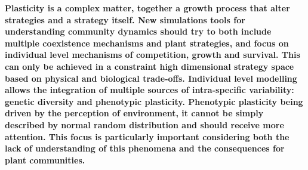 %



\textbf{Plasticity is a complex matter, together a growth process that alter strategies and a strategy itself. New simulations tools for understanding community dynamics should try to both include multiple coexistence mechanisms and plant strategies, and focus on individual level mechanisms of competition, growth and survival. This can only be achieved in a constraint high dimensional strategy space based on physical and biological trade-offs. Individual level modelling allows the integration of multiple sources of intra-specific variability: genetic diversity and phenotypic plasticity. Phenotypic plasticity being driven by the perception of environment, it cannot be simply described by normal random distribution and should receive more attention. This focus is particularly important considering both the lack of understanding of this phenomena and the consequences for plant communities.  }



